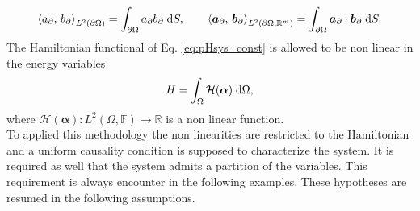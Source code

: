 \begin{equation}
\inner[L^2(\partial\Omega)]{a_\partial}{b_\partial} = \int_{\partial\Omega} a_\partial b_\partial \d{S}, \qquad \inner[L^2(\partial\Omega, \mathbb{R}^m)]{\bm{a}_\partial}{\bm{b}_\partial} = \int_{\partial\Omega} \bm{a}_\partial \cdot \bm{b}_\partial \d{S}.
\end{equation} 
 The Hamiltonian functional of Eq. \eqref{eq:pHsys_const} is allowed to be non linear in the energy variables
\begin{equation*}
H = \int_\Omega \mathcal{H}(\bm{\alpha}) \d\Omega,
\end{equation*}
where $\mathcal{H}(\bm{\alpha}): L^2(\Omega, \mathbb{F}) \rightarrow \mathbb{R}$ is a non linear function.
\\

To applied this methodology the non linearities are restricted to the Hamiltonian and a uniform causality condition is supposed to characterize the system. It is required as well that the system admits a partition of the variables. This requirement is always encounter in the following examples. These hypotheses are resumed in the following assumptions.

